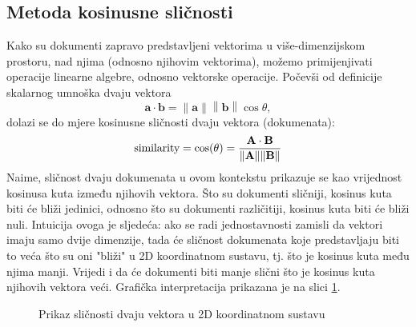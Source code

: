 \documentclass[times, utf8, zavrsni, numeric]{fer}
\begin{document}
\subsection{Metoda kosinusne sličnosti}
Kako su dokumenti zapravo predstavljeni vektorima u više-dimenzijskom prostoru, nad njima (odnosno njihovim vektorima), možemo primijenjivati operacije linearne algebre, odnosno vektorske operacije. Počevši od definicije skalarnog umnoška dvaju vektora
\begin{equation}
\mathbf {a} \cdot \mathbf {b} =\left\|\mathbf {a} \right\|\left\|\mathbf {b} \right\|\cos \theta,
\end{equation}
dolazi se do mjere kosinusne sličnosti dvaju vektora (dokumenata):
\begin{equation}
{\text{similarity}}=\cos(\theta )={\mathbf {A} \cdot \mathbf {B}  \over \|\mathbf {A} \|\|\mathbf {B}\|}
\end{equation}
Naime, sličnost dvaju dokumenata u ovom kontekstu prikazuje se kao vrijednost kosinusa kuta između njihovih vektora. Što su dokumenti sličniji, kosinus kuta biti će bliži jedinici, odnosno što su dokumenti različitiji, kosinus kuta biti će bliži nuli. Intuicija ovoga je sljedeća: ako se radi jednostavnosti zamisli da vektori imaju samo dvije dimenzije, tada će sličnost dokumenata koje predstavljaju biti to veća što su oni "bliži" u 2D koordinatnom sustavu, tj. što je kosinus kuta među njima manji. Vrijedi i da će dokumenti biti manje slični što je kosinus kuta njihovih vektora veći. Grafička interpretacija prikazana je na slici \ref{fig:vectors}.

\begin{figure}
\caption{Prikaz sličnosti dvaju vektora u 2D koordinatnom sustavu}
\label{fig:vectors}
\end{figure}
\end{document}
